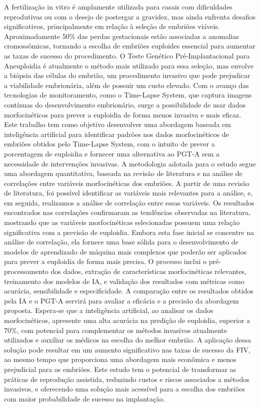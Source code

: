 \begin{resumo}
A fertilização in vitro é amplamente utilizada para casais com dificuldades reprodutivas ou com o desejo de postergar a gravidez, mas ainda enfrenta desafios significativos, principalmente em relação à seleção de embriões viáveis. Aproximadamente 50\% das perdas gestacionais estão associadas a anomalias cromossômicas, tornando a escolha de embriões euploides essencial para aumentar as taxas de sucesso do procedimento. O Teste Genético Pré-Implantacional para Aneuploidia é atualmente o método mais utilizado para essa seleção, mas envolve a biópsia das células do embrião, um procedimento invasivo que pode prejudicar a viabilidade embrionária, além de possuir um custo elevado. Com o avanço das tecnologias de monitoramento, como o Time-Lapse System, que captura imagens contínuas do desenvolvimento embrionário, surge a possibilidade de usar dados morfocinéticos para prever a euploidia de forma menos invasiva e mais eficaz. Este trabalho tem como objetivo desenvolver uma abordagem baseada em inteligência artificial para identificar padrões nos dados morfocinéticos de embriões obtidos pelo Time-Lapse System, com o intuito de prever a porcentagem de euploidia e fornecer uma alternativa ao PGT-A sem a necessidade de intervenções invasivas. A metodologia adotada para o estudo segue uma abordagem quantitativa, baseada na revisão de literatura e na análise de correlações entre variáveis morfocinéticas dos embriões. A partir de uma revisão de literatura, foi possível identificar as variáveis mais relevantes para a análise, e, em seguida, realizamos a análise de correlação entre essas variáveis. Os resultados encontrados nas correlações confirmaram as tendências observadas na literatura, mostrando que as variáveis morfocinéticas selecionadas possuem uma relação significativa com a previsão de euploidia. Embora esta fase inicial se concentre na análise de correlação, ela fornece uma base sólida para o desenvolvimento de modelos de aprendizado de máquina mais complexos que poderão ser aplicados para prever a euploidia de forma mais precisa. O processo inclui o pré-processamento dos dados, extração de características morfocinéticas relevantes, treinamento dos modelos de IA, e validação dos resultados com métricas como acurácia, sensibilidade e especificidade. A comparação entre os resultados obtidos pela IA e o PGT-A servirá para avaliar a eficácia e a precisão da abordagem proposta. Espera-se que a inteligência artificial, ao analisar os dados morfocinéticos, apresente uma alta acurácia na predição de euploidia, superior a 70\%, com potencial para complementar os métodos invasivos atualmente utilizados e auxiliar os médicos na escolha do melhor embrião. A aplicação dessa solução pode resultar em um aumento significativo nas taxas de sucesso da FIV, ao mesmo tempo que proporciona uma abordagem mais econômica e menos prejudicial para os embriões. Este estudo tem o potencial de transformar as práticas de reprodução assistida, reduzindo custos e riscos associados a métodos invasivos, e oferecendo uma solução mais acessível para a escolha dos embriões com maior probabilidade de sucesso na implantação.


\end{resumo}
